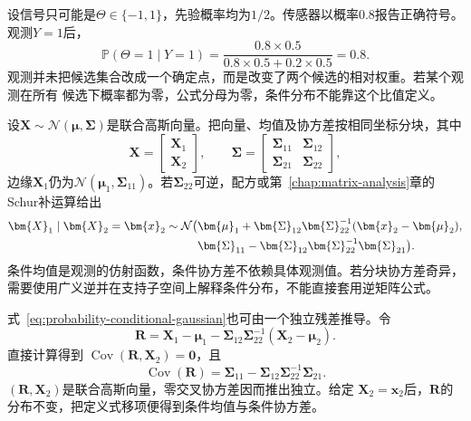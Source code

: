 \begin{example}[有限候选经过带噪观测更新]
\label{ex:probability-finite-candidate-bayes}
设信号只可能是\(\Theta\in\{-1,1\}\)，先验概率均为\(1/2\)。传感器以概率\(0.8\)报告正确符号。观测\(Y=1\)后，
\[ \mathbb{P}(\Theta=1\mid Y=1)
  =\frac{0.8\times0.5}{0.8\times0.5+0.2\times0.5}=0.8. \]
观测并未把候选集合改成一个确定点，而是改变了两个候选的相对权重。若某个观测在所有
候选下概率都为零，公式分母为零，条件分布不能靠这个比值定义。
\end{example}
设\(\bm X\sim\mathcal N(\bm\mu,\bm\Sigma)\)是联合高斯向量。把向量、均值及协方差按相同坐标分块，其中
\[
  \bm{X}=
  \begin{bmatrix}\bm{X}_1\\\bm{X}_2\end{bmatrix},
  \qquad
  \bm{\Sigma}=
  \begin{bmatrix}
    \bm{\Sigma}_{11}&\bm{\Sigma}_{12}\\
    \bm{\Sigma}_{21}&\bm{\Sigma}_{22}
  \end{bmatrix},
\]
边缘\(\bm{X}_1\)仍为\(\mathcal{N}(\bm{\mu}_1,\bm{\Sigma}_{11})\)。若\(\bm{\Sigma}_{22}\)可逆，配方或第~\ref{chap:matrix-analysis}章的Schur补运算给出
\begin{align}
  \bm{X}_1\mid\bm{X}_2=\bm{x}_2
  \sim\mathcal{N}\bigl(
  &\bm{\mu}_1+
  \bm{\Sigma}_{12}\bm{\Sigma}_{22}^{-1}
  (\bm{x}_2-\bm{\mu}_2),\notag\\
  &\bm{\Sigma}_{11}
  -\bm{\Sigma}_{12}\bm{\Sigma}_{22}^{-1}
  \bm{\Sigma}_{21}
  \bigr).
  \label{eq:probability-conditional-gaussian}
\end{align}
条件均值是观测的仿射函数，条件协方差不依赖具体观测值。若分块协方差奇异，需要使用广义逆并在支持子空间上解释条件分布，不能直接套用逆矩阵公式。

式~\eqref{eq:probability-conditional-gaussian}也可由一个独立残差推导。令
\[
  \bm{R}
  =\bm{X}_1-\bm{\mu}_1
   -\bm{\Sigma}_{12}\bm{\Sigma}_{22}^{-1}
    (\bm{X}_2-\bm{\mu}_2).
\]
直接计算得到
\(\operatorname{Cov}(\bm{R},\bm{X}_2)=\bm{0}\)，且
\[
  \operatorname{Cov}(\bm{R})
  =\bm{\Sigma}_{11}
   -\bm{\Sigma}_{12}\bm{\Sigma}_{22}^{-1}\bm{\Sigma}_{21}.
\]
\((\bm{R},\bm{X}_2)\)是联合高斯向量，零交叉协方差因而推出独立。给定
\(\bm{X}_2=\bm{x}_2\)后，\(\bm{R}\)的分布不变，把定义式移项便得到条件均值与条件协方差。


